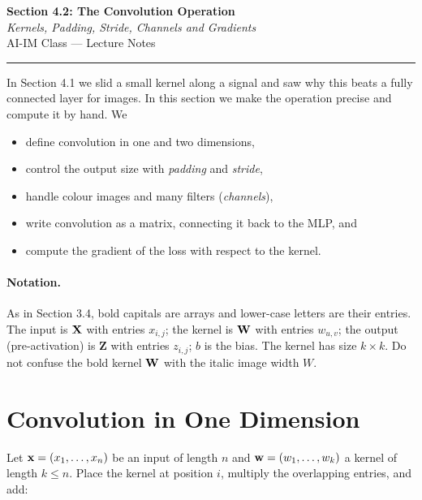 \documentclass[12pt, a4paper]{article}
\providecommand{\bZ}{\mathbf{Z}}
\begin{document}
\begin{center}
  {\LARGE \textbf{Section 4.2: The Convolution Operation}} \\[0.3em]
  {\large\itshape Kernels, Padding, Stride, Channels and Gradients} \\[0.5em]
  {\large AI-IM Class --- Lecture Notes}%
  \ifstudentmode
  \fi
\end{center}

\vspace{1em}
\hrule
\vspace{1.5em}

In Section 4.1 we slid a small kernel along a signal and saw why this beats
a fully connected layer for images. In this section we make the operation
precise and compute it by hand. We
\begin{itemize}[nosep]
  \item define convolution in one and two dimensions,
  \item control the output size with \emph{padding} and \emph{stride},
  \item handle colour images and many filters (\emph{channels}),
  \item write convolution as a matrix, connecting it back to the MLP, and
  \item compute the gradient of the loss with respect to the kernel.
\end{itemize}

\paragraph{Notation.}
As in Section 3.4, bold capitals are arrays and lower-case letters are their
entries. The input is $\mathbf{X}$ with entries $x_{i,j}$; the kernel is $\mathbf{W}$ with
entries $w_{u,v}$; the output (pre-activation) is $\bZ$ with entries
$z_{i,j}$; $b$ is the bias. The kernel has size $k \times k$. Do not confuse
the bold kernel $\mathbf{W}$ with the italic image width $W$.

\section{Convolution in One Dimension}

Let $\mathbf{x} = (x_1, \dots, x_n)$ be an input of length $n$ and
$\mathbf{w} = (w_1, \dots, w_k)$ a kernel of length $k \le n$. Place the kernel at
position $i$, multiply the overlapping entries, and add:
\end{document}
